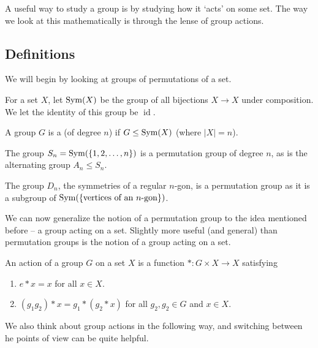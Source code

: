 \documentclass[a4paper]{scrartcl}
\begin{document}
A useful way to study a group is by studying how it `acts' on some set.
The way we look at this mathematically is through the lense of group actions.

\subsection{Definitions}

We will begin by looking at groups of permutations of a set.

\begin{definition}[$\sym(X)$]
	For a set $X$, let $\sym(X)$ be the group of all bijections $X \rightarrow X$ under composition. We let the identity of this group be $\operatorname{id}$.
\end{definition}

\begin{definition}
	A group $G$ is a  (of degree $n$) if $G \leq \operatorname{Sym}(X)$ (where $|X| = n$).
\end{definition}

\begin{example}
	The group $S_n = \operatorname{Sym}(\{1, 2, \dots, n\})$ is a permutation group of degree $n$, as is the alternating group $A_n \leq S_n$.

	The group $D_n$, the symmetries of a regular $n$-gon, is a permutation group as it is a subgroup of $\operatorname{Sym}(\{\text{vertices of an $n$-gon}\})$.
\end{example}

We can now generalize the notion of a permutation group to the idea mentioned before -- a group acting on a set.
Slightly more useful (and general) than permutation groups is the notion of a group acting on a set.

\begin{definition}
	An action of a group $G$ on a set $X$ is a function $*: G \times X \rightarrow X$ satisfying
	\begin{enumerate}[label=(\roman*)]
		\item $e * x = x$ for all $x \in X$.
		\item $(g_1 g_2) * x = g_1 * (g_2 * x)$ for all $g_2, g_2 \in G$ and $x \in X$.
	\end{enumerate}
\end{definition}

We also think about group actions in the following way, and switching between he points of view can be quite helpful.
\end{document}
